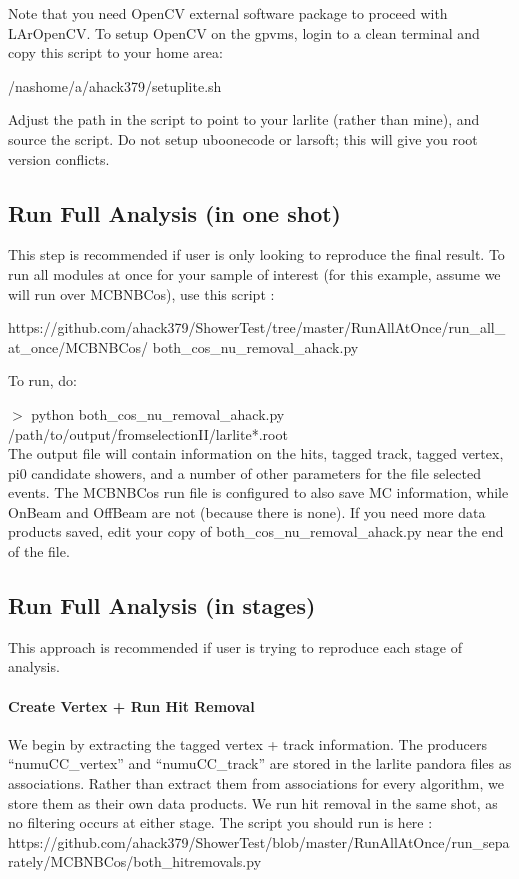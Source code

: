\documentclass{article}
\begin{document}
\noindent Note that you need OpenCV external software package to proceed with LArOpenCV.  To setup OpenCV on the gpvms, login to a clean terminal and copy this script to your home area:

\par /nashome/a/ahack379/setuplite.sh 

\noindent Adjust the path in the script to point to your larlite (rather than mine), and source the script.  Do not setup uboonecode or larsoft; this will give you root version conflicts.

\subsection{Run Full Analysis (in one shot)} 
This step is recommended if user is only looking to reproduce the final result. To run all modules at once for your sample of interest (for this example, assume we will run over MCBNBCos), use this script :

\noindent https://github.com/ahack379/ShowerTest/tree/master/RunAllAtOnce/run\_all\_at\_once/MCBNBCos/
both\_cos\_nu\_removal\_ahack.py

\noindent To run, do: 
\par $>$ python both\_cos\_nu\_removal\_ahack.py /path/to/output/fromselectionII/larlite*.root\\

\noindent The output file will contain information on the hits, tagged track, tagged vertex, pi0 candidate showers, and a number of other parameters for the file selected events. The MCBNBCos run file is configured to also save MC information, while OnBeam and OffBeam are not (because there is none).  If you need more data products saved, edit your copy of both\_cos\_nu\_removal\_ahack.py near the end of the file.  
 
\subsection{Run Full Analysis (in stages) }
This approach is recommended if user is trying to reproduce each stage of analysis. 
\paragraph{Create Vertex + Run Hit Removal} We begin by extracting the tagged vertex + track information. The producers “numuCC\_vertex” and “numuCC\_track” are stored in the larlite pandora files as associations.  Rather than extract them from associations for every algorithm, we store them as their own data products.  We run hit removal in the same shot, as no filtering occurs at either stage. The script you should run is here : 
\noindent https://github.com/ahack379/ShowerTest/blob/master/RunAllAtOnce/run\_separately/MCBNBCos/both\_hitremovals.py
\end{document}
